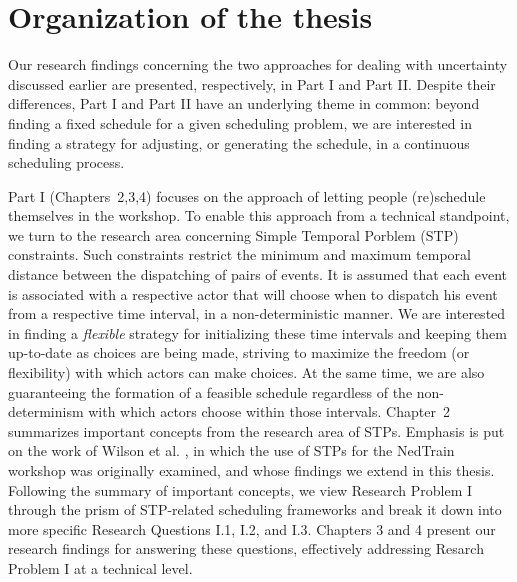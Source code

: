 \section{Organization of the thesis}
		Our research findings concerning the two approaches for dealing with uncertainty discussed earlier are presented, 
		respectively, in Part I and Part II.
		Despite their differences, Part I and Part II have an underlying theme in common: 
		beyond finding a fixed schedule for a given scheduling problem,
		we are interested in finding a strategy for adjusting, or generating the schedule, 
		in a continuous scheduling process.

		Part I (Chapters~2,3,4) focuses on the approach
		of letting people (re)schedule themselves in the workshop.
		To enable this approach from a technical standpoint, 
		we turn to the research area concerning Simple Temporal Porblem (STP) constraints.
		Such constraints restrict the minimum and maximum temporal distance between the dispatching of pairs of events.
		It is assumed that each event is associated with a respective actor that will choose when to dispatch his event from a respective time interval,
		in a non-deterministic manner.
		We are interested in finding a \emph{flexible} strategy for initializing these time intervals and keeping them up-to-date as choices are being made,
		striving to maximize the freedom (or flexibility) with which actors can make choices.
		At the same time, we are also guaranteeing the formation of a feasible schedule
		regardless of the non-determinism with which actors choose within those intervals.
		Chapter~2 summarizes important concepts from the research area of STPs.
		Emphasis is put on the work of Wilson et al. \cite{wilson:2016},
		in which the use of STPs for the NedTrain workshop was originally examined, 
		and whose findings we extend in this thesis.
		Following the summary of important concepts, 
		we view Research Problem I through the prism of STP-related scheduling frameworks 
		and break it down into more specific Research Questions I.1, I.2, and I.3.
		Chapters 3 and 4 present our research findings for answering these questions, 
		effectively addressing Resarch Problem I at a technical level.
	
